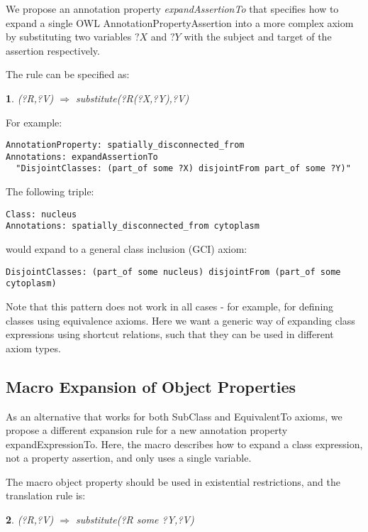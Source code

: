 \documentclass{llncs}
\newtheorem{expr}{}[section]
\begin{document}
We propose an annotation property \emph{expandAssertionTo} that
specifies how to expand a single OWL AnnotationPropertyAssertion into a more
complex axiom by substituting two variables $?X$ and $?Y$ with the
subject and target of the assertion respectively.

The rule can be specified as:

\begin{expr}\label{exp-pa}
(?R,?V)  $\Rightarrow$ substitute(?R(?X,?Y),?V)
\end{expr}

For example:

\begin{verbatim}
AnnotationProperty: spatially_disconnected_from
Annotations: expandAssertionTo 
  "DisjointClasses: (part_of some ?X) disjointFrom part_of some ?Y)"
\end{verbatim}

The following triple:

\begin{verbatim}
Class: nucleus
Annotations: spatially_disconnected_from cytoplasm
\end{verbatim}

would expand to a general class inclusion (GCI) axiom:

\begin{verbatim}
DisjointClasses: (part_of some nucleus) disjointFrom (part_of some cytoplasm)
\end{verbatim}

Note that this pattern does not work in all cases - for example, for
defining classes using equivalence axioms. Here we want a generic way
of expanding class expressions using shortcut relations, such that
they can be used in different axiom types.

\subsection{Macro Expansion of Object Properties}

As an alternative that works for both SubClass and EquivalentTo
axioms, we propose a different expansion rule for a new annotation
property expandExpressionTo. Here, the macro describes how to expand a class
expression, not a property assertion, and only uses a single variable.

The macro object property should be used in existential restrictions,
and the translation rule is:

\begin{expr}\label{exp-some}
(?R,?V)  $\Rightarrow$ substitute(?R some ?Y,?V)
\end{expr}
\end{document}

